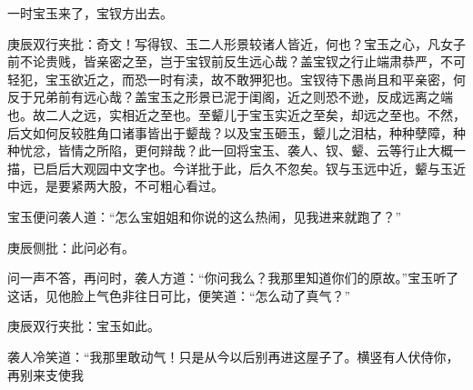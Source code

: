 \begin{parag}
    一时宝玉来了，宝钗方出去。\begin{note}庚辰双行夹批：奇文！写得钗、玉二人形景较诸人皆近，何也？宝玉之心，凡女子前不论贵贱，皆亲密之至，岂于宝钗前反生远心哉？盖宝钗之行止端肃恭严，不可轻犯，宝玉欲近之，而恐一时有渎，故不敢狎犯也。宝钗待下愚尚且和平亲密，何反于兄弟前有远心哉？盖宝玉之形景已泥于闺阁，近之则恐不逊，反成远离之端也。故二人之远，实相近之至也。至颦儿于宝玉实近之至矣，却远之至也。不然，后文如何反较胜角口诸事皆出于颦哉？以及宝玉砸玉，颦儿之泪枯，种种孽障，种种忧忿，皆情之所陷，更何辩哉？此一回将宝玉、袭人、钗、颦、云等行止大概一描，已启后大观园中文字也。今详批于此，后久不忽矣。钗与玉远中近，颦与玉近中远，是要紧两大股，不可粗心看过。\end{note}宝玉便问袭人道：“怎么宝姐姐和你说的这么热闹，见我进来就跑了？”\begin{note}庚辰侧批：此问必有。\end{note}问一声不答，再问时，袭人方道：“你问我么？我那里知道你们的原故。”宝玉听了这话，见他脸上气色非往日可比，便笑道：“怎么动了真气？”\begin{note}庚辰双行夹批：宝玉如此。\end{note}袭人冷笑道：“我那里敢动气！只是从今以后别再进这屋子了。横竖有人伏侍你，再别来支使我
\end{parag}
